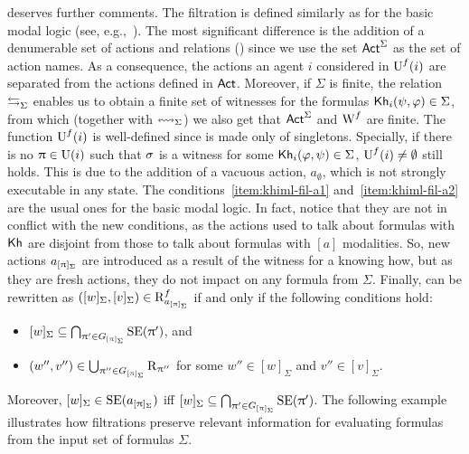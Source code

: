  deserves further comments.
The filtration is defined similarly as for the basic modal logic (see, e.g.,~\cite{mlbook}).
The most significant difference is the addition of a denumerable set of actions and relations () since we use the set ${\rm \sf Act}^\Sigma$ as the set of action names.
As a consequence, the actions an agent $i$ considered in $\operatorname{U}^f(i)$ are separated from the actions defined in ${\rm \sf Act}$.
Moreover, if $\Sigma$ is finite, the relation $\mathrel{\leftrightarrows}_\Sigma$ enables us to obtain a finite set of witnesses for the formulas ${\sf Kh}_i(\psi,\varphi)\in\Sigma$, from which (together with $\leftrightsquigarrow_\Sigma$) we also get that ${\rm \sf Act}^\Sigma$ and $\operatorname{W}^f$ are finite.
The function $\operatorname{U}^f(i)$ is well-defined since is made only of singletons. Specially, if there is no $\uppi \in \operatorname{U}(i)$ such that $\sigma$ is a witness for some ${\sf Kh}_i(\varphi,\psi) \in \Sigma$, $\operatorname{U}^f(i)\neq \emptyset$ still holds.
This is due to the addition of a vacuous action, $a_\emptyset$, which is not strongly executable in any state.
The conditions~\ref{item:khiml-fil-a1} and~\ref{item:khiml-fil-a2} are the usual ones for the basic modal logic.
In fact, notice that they are not in conflict with the new conditions, as the actions used to talk about formulas with ${\sf Kh}$ are disjoint from those to talk about formulas with $[a]$ modalities.
So, new actions $a_{[\uppi]_\Sigma}$ are introduced as a result of the witness for a knowing how, but as they are fresh actions, they do not impact on any formula from $\Sigma$.
Finally,  can be rewritten as $([w]_\Sigma,[v]_\Sigma) \in \operatorname{R}^f_{a_{[\uppi]_\Sigma}}$ if and only if the following conditions hold:

\begin{itemize}
\item $[w]_\Sigma \subseteq \bigcap_{\uppi' \in G_{[\uppi]_\Sigma}} \operatorname{SE}(\uppi')$, and
\item $(w'',v'') \in \bigcup_{\uppi'' \in G_{[\uppi]_\Sigma}} \operatorname{R}_{\uppi''}$ for some $w'' \in [w]_\Sigma$ and $v'' \in [v]_\Sigma$.
\end{itemize}

Moreover, $[w]_\Sigma \in \operatorname{SE}(a_{[\uppi]_\Sigma})$ iff $[w]_\Sigma \subseteq \bigcap_{\uppi' \in G_{[\uppi]_\Sigma}} \operatorname{SE}(\uppi')$.
The following example illustrates how filtrations preserve relevant information for evaluating formulas from the input set of formulas $\Sigma$.

\medskip

